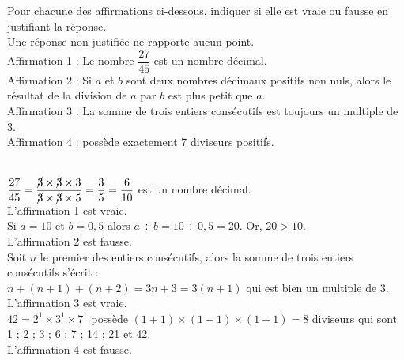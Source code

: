 \bigskip


\begin{exercice}[CRPE 2020 G5] %
   Pour chacune des affirmations ci-dessous, indiquer si elle est vraie ou fausse en justifiant la réponse. \\
   Une réponse non justifiée ne rapporte aucun point. \\ [1mm]
   Affirmation 1 : \og Le nombre $\dfrac{27}{45}$ est un nombre décimal. \fg \\ [1mm]
   Affirmation 2 : \og Si $a$ et $b$ sont deux nombres décimaux positifs non nuls, alors le résultat de la division de $a$ par $b$ est plus petit que $a$. \fg \\
   Affirmation 3 : \og La somme de trois entiers consécutifs est toujours un multiple de 3. \fg \\
   Affirmation 4 :  possède exactement 7 diviseurs positifs. \fg
\end{exercice}

\begin{corrige}
\ \\ [-5mm]
   $\dfrac{27}{45} =\dfrac{\cancel{3}\times\cancel{3}\times3}{\cancel{3}\times\cancel{3}\times5} =\dfrac35 =\dfrac{6}{10}$ est un nombre décimal. \\ [1mm]
      {\blue L'affirmation 1 est vraie}. \\
   Si $a =10$ et $b =0,5$ alors $a\div b =10\div0,5 =20$. Or, $20>10$. \\
      {\blue L'affirmation 2 est fausse}. \\
   Soit $n$ le premier des entiers consécutifs, alors la somme de trois entiers consécutifs s'écrit : \\
      $n+(n+1)+(n+2) =3n+3 =3(n+1)$ qui est bien un multiple de 3. \\
      {\blue L'affirmation 3 est vraie}. \\
   $42 =2^1\times3^1\times7^1$ possède $(1+1)\times(1+1)\times(1+1) =8$ diviseurs qui sont 1 ; 2 ; 3 ; 6 ; 7 ;  14 ; 21 et 42. \\
      {\blue L'affirmation 4 est fausse}. \\
\end{corrige}


\bigskip



